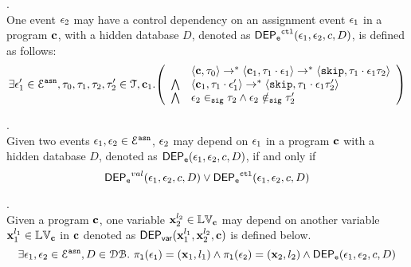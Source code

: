 %
\begin{defn}
\label{def:event_ctldep}.
\\
One event $\mathtt{\epsilon}_2$ may have a control dependency on an assignment event $\mathtt{\epsilon}_1$
in a program ${\boldsymbol{\mathbf{c}}}$, with a hidden database $D$, 
denoted as 
%
$\mathsf{DEP_{\mathtt{e}}}^{\mathtt{{ctl}}}(\mathtt{\epsilon}_1, \mathtt{\epsilon}_2, c, D)$, is defined as follows: 
%
\[
\exists \event_1' \in \eventset^{\asn}, \vtrace_0,
\vtrace_1, \vtrace_2, \vtrace_2' \in \mathcal{T}, \ssa{c}_1.
  \left(
  \begin{array}{ll}   
  & \config{\ssa{c}, \vtrace_0} \rightarrow^{*} 
    \config{\ssa{c}_1, \vtrace_1 \cdot \event_1}  \rightarrow^{*} 
    \config{\eskip,  \vtrace_1 \cdot \event_1 \vtrace_2} 
  \\ 
  \bigwedge &
  \config{\ssa{c}_1, \vtrace_1 \cdot \event_1'}  \rightarrow^{*} 
  \config{\eskip,  \vtrace_1 \cdot \event_1 \vtrace_2' } 
  \\
  \bigwedge &
  \event_2 \sigin \vtrace_2 \land \event_2 \notsigin \vtrace_2'
\end{array}
\right)
 \]
%
\end{defn}
%
%
\begin{defn}.
\label{def:event_dep}
\\ 
Given two events $\mathtt{\epsilon}_1, \mathtt{\epsilon}_2 \in \mathcal{E}^{\mathtt{{asn}}}$,
$\mathtt{\epsilon}_2$ may depend on $\mathtt{\epsilon}_1$ in a program ${\boldsymbol{\mathbf{c}}}$ with a hidden database $D$, denoted as $\mathsf{DEP_{\mathtt{e}}}(\mathtt{\epsilon}_1, \mathtt{\epsilon}_2, c, D)$,
if and only if
%
\[
\mathsf{DEP_{\mathtt{e}}}^{val}(\mathtt{\epsilon}_1, \mathtt{\epsilon}_2, c, D) 
\lor
\mathsf{DEP_{\mathtt{e}}}^{\mathtt{{ctl}}}(\mathtt{\epsilon}_1, \mathtt{\epsilon}_2, c, D) 
\] %
%
\end{defn}
%
\begin{defn}.
\label{def:var_dep}
\\
Given a program ${\boldsymbol{\mathbf{c}}}$, 
one variable ${\boldsymbol{\mathbf{x}}}_2^{l_2} \in \mathbb{LV}_{{\boldsymbol{\mathbf{c}}}}$ may depend on another variable 
${\boldsymbol{\mathbf{x}}}_1^{l_1} \in \mathbb{LV}_{{\boldsymbol{\mathbf{c}}}}$ in ${\boldsymbol{\mathbf{c}}}$ denoted as 
%
$\mathsf{DEP_{var}}({\boldsymbol{\mathbf{x}}}_1^{l_1}, {\boldsymbol{\mathbf{x}}}_2^{l_2}, {\boldsymbol{\mathbf{c}}})$ is defined below.
%
\[
\exists \mathtt{\epsilon}_1, \mathtt{\epsilon}_2 \in \mathcal{E}^{\mathtt{{asn}}}, D \in \mathcal{DB}. ~
\mathtt{\pi_{l}(\mathtt{\epsilon}_1)} = ({\boldsymbol{\mathbf{x}}}_1, l_1)
\land
\mathtt{\pi_{l}(\mathtt{\epsilon}_2)} = ({\boldsymbol{\mathbf{x}}}_2, l_2)
\land 
\mathsf{DEP_{\mathtt{e}}}(\mathtt{\epsilon}_1, \mathtt{\epsilon}_2, c, D)
\] 
%
%
\end{defn}
